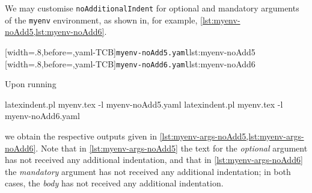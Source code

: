  \begin{example}
 We may customise \texttt{noAdditionalIndent} for optional and mandatory arguments of the
 \texttt{myenv} environment, as shown in, for example,
 \cref{lst:myenv-noAdd5,lst:myenv-noAdd6}.

 \begin{cmhtcbraster}
  [width=.8\linewidth,before=\centering,yaml-TCB]{\texttt{myenv-noAdd5.yaml}}{lst:myenv-noAdd5}
  [width=.8\linewidth,before=\centering,yaml-TCB]{\texttt{myenv-noAdd6.yaml}}{lst:myenv-noAdd6}
 \end{cmhtcbraster}

 Upon running 

 \begin{commandshell}
latexindent.pl myenv.tex -l myenv-noAdd5.yaml  
latexindent.pl myenv.tex -l myenv-noAdd6.yaml  
\end{commandshell}

 we obtain the respective outputs given in
 \cref{lst:myenv-args-noAdd5,lst:myenv-args-noAdd6}. Note that in
 \cref{lst:myenv-args-noAdd5} the text for the \emph{optional} argument has not received
 any additional indentation, and that in \cref{lst:myenv-args-noAdd6} the
 \emph{mandatory} argument has not received any additional indentation; in both cases,
 the \emph{body} has not received any additional indentation.

 \begin{cmhtcbraster}
 \end{cmhtcbraster}
 \end{example}

